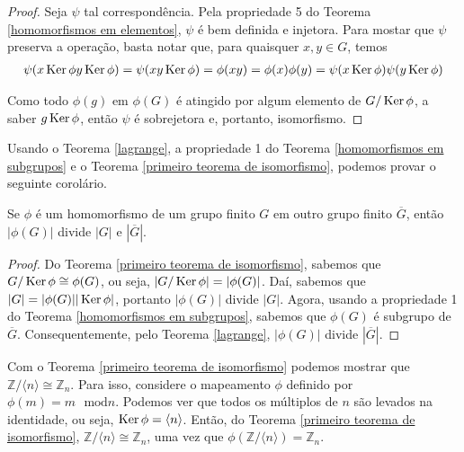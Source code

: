 	\begin{proof}
		Seja $\psi$ tal correspondência. Pela propriedade 5 do Teorema \eqref{homomorfismos em elementos}, $\psi$ é bem definida e injetora. Para mostar que $\psi$ preserva a operação, basta notar que, para quaisquer $x,y\in G$, temos
		\begin{align*}
		\psi(x\operatorname{Ker}\phi y\operatorname{Ker}\phi) = \psi(xy\operatorname{Ker}\phi) = \phi(xy) = \phi(x)\phi(y) = \psi(x\operatorname{Ker}\phi)\psi(y\operatorname{Ker}\phi)
		\end{align*}
		
		\par\vspace{0.3cm} Como todo $\phi(g)$ em $\phi(G)$ é atingido por algum elemento de $G/\operatorname{Ker}\phi$, a saber $g\operatorname{Ker}\phi$, então $\psi$ é sobrejetora e, portanto, isomorfismo.
	\end{proof}
	
	\par\vspace{0.3cm} Usando o Teorema \eqref{lagrange}, a propriedade 1 do Teorema \eqref{homomorfismos em subgrupos} e o Teorema \eqref{primeiro teorema de isomorfismo}, podemos provar o seguinte corolário.
	
	\begin{corollary}
		Se $\phi$ é um homomorfismo de um grupo finito $G$ em outro grupo finito $\overline{G}$, então $|\phi(G)|$ divide $|G|$ e $|\overline{G}|$.
	\end{corollary}
	
	\begin{proof}
		Do Teorema \eqref{primeiro teorema de isomorfismo}, sabemos que $G/\operatorname{Ker}\phi\cong\phi(G)$, ou seja, $|G/\operatorname{Ker}\phi| = |\phi(G)|$. Daí, sabemos que $|G| = |\phi(G)||\operatorname{Ker}\phi|$, portanto $|\phi(G)|$ divide $|G|$. Agora, usando a propriedade 1 do Teorema \eqref{homomorfismos em subgrupos}, sabemos que $\phi(G)$ é subgrupo de $\overline{G}$. Consequentemente, pelo Teorema \eqref{lagrange}, $|\phi(G)|$ divide $|\overline{G}|$.
	\end{proof}
	\par\vspace{0.3cm} Com o Teorema \eqref{primeiro teorema de isomorfismo} podemos mostrar que $\mathbb{Z}/\langle n \rangle\cong \mathbb{Z}_n$. Para isso, considere o mapeamento $\phi$ definido por $\phi(m) = m\text{ }\mathrm{mod} n$. Podemos ver que todos os múltiplos de $n$ são levados na identidade, ou seja, $\operatorname{Ker}\phi = \langle n \rangle$. Então, do Teorema \eqref{primeiro teorema de isomorfismo}, $\mathbb{Z}/\langle n \rangle\cong \mathbb{Z}_n$, uma vez que $\phi(\mathbb{Z}/\langle n \rangle) = \mathbb{Z}_n$.
	
